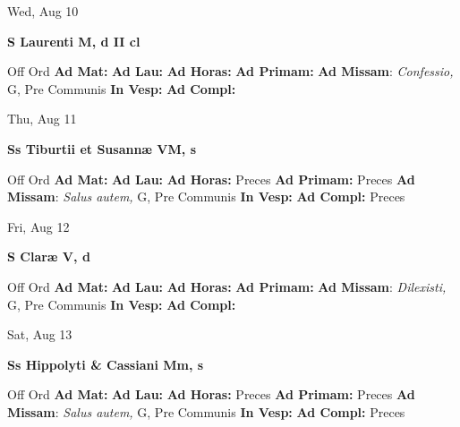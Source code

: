 \documentclass[10pt]{article}
\begin{document}
\begin{minipage}{3.5in}
\vspace{2em}\begin{center}
Wed, Aug 10
\end{center}\textbf{ \large S Laurenti M, \textnormal{\normalsize d II cl}}
\begin{justify}
Off Ord
\textbf{Ad Mat: }
\textbf{Ad Lau: }
\textbf{Ad Horas: }
\textbf{Ad Primam: }
\textbf{Ad Missam}: \textit{Confessio,} G, Pre Communis
\textbf{In Vesp: }
\textbf{Ad Compl: }\end{justify}
\end{minipage}



\begin{minipage}{3.5in}
\vspace{2em}\begin{center}
Thu, Aug 11
\end{center}\textbf{ \large Ss Tiburtii et Susannæ VM, \textnormal{\normalsize s}}
\begin{justify}
Off Ord
\textbf{Ad Mat: }
\textbf{Ad Lau: }
\textbf{Ad Horas: }Preces
\textbf{Ad Primam: }Preces
\textbf{Ad Missam}: \textit{Salus autem,} G, Pre Communis
\textbf{In Vesp: }
\textbf{Ad Compl: }Preces\end{justify}
\end{minipage}



\begin{minipage}{3.5in}
\vspace{2em}\begin{center}
Fri, Aug 12
\end{center}\textbf{ \large S Claræ V, \textnormal{\normalsize d}}
\begin{justify}
Off Ord
\textbf{Ad Mat: }
\textbf{Ad Lau: }
\textbf{Ad Horas: }
\textbf{Ad Primam: }
\textbf{Ad Missam}: \textit{Dilexisti,} G, Pre Communis
\textbf{In Vesp: }
\textbf{Ad Compl: }\end{justify}
\end{minipage}



\begin{minipage}{3.5in}
\vspace{2em}\begin{center}
Sat, Aug 13
\end{center}\textbf{ \large Ss Hippolyti \& Cassiani Mm, \textnormal{\normalsize s}}
\begin{justify}
Off Ord
\textbf{Ad Mat: }
\textbf{Ad Lau: }
\textbf{Ad Horas: }Preces
\textbf{Ad Primam: }Preces
\textbf{Ad Missam}: \textit{Salus autem,} G, Pre Communis
\textbf{In Vesp: }
\textbf{Ad Compl: }Preces\end{justify}
\end{minipage}
\end{document}
